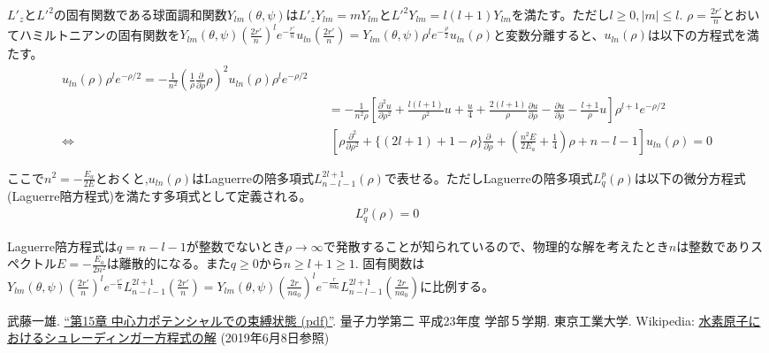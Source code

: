\documentclass[11pt,a4paper]{jsarticle}
\begin{document}
$L'_z$と$L'^2$の固有関数である球面調和関数$Y_{lm}(\theta,\psi)$は$L'_zY_{lm}=mY_{lm}$と$L'^2Y_{lm}=l(l+1)Y_{lm}$を満たす。ただし$l \ge 0, |m|\le l$. $\rho=\frac{2r'}{n}$とおいてハミルトニアンの固有関数を$Y_{lm}(\theta,\psi)(\frac{2r'}{n})^l e^{-\frac{r'}{n}} u_{ln}(\frac{2r'}{n})=Y_{lm}(\theta,\psi) \rho^l e^{-\frac{\rho}{2}} u_{ln}(\rho)$と変数分離すると、$u_{ln}(\rho)$は以下の方程式を満たす。
\begin{eqnarray}
[ \frac{E}{2E_a} &&+ \frac{1}{n \rho} - \frac{l(l+1)}{n^2 \rho^2}]u_{ln}(\rho)\rho^l e^{-\rho/2} = -\frac{1}{n^2}(\frac{1}{\rho}\frac{\partial }{\partial \rho }\rho)^2  u_{ln}(\rho)\rho^l e^{-\rho/2}\\
&&= -\frac{1}{n^2 \rho} [\frac{\partial^2 u}{\partial \rho^2}+\frac{l(l+1)}{\rho^2}u +\frac{u}{4} +\frac{2(l+1)}{\rho}\frac{\partial u}{\partial \rho} -\frac{\partial u}{\partial \rho} -\frac{l+1}{ \rho} u] \rho^{l+1} e^{-\rho/2}\\
\Leftrightarrow && \: [ \rho \frac{\partial^2}{\partial \rho^2} + \{ (2l+1)+1-\rho \} \frac{\partial}{\partial \rho} + (\frac{n^2 E}{2E_a} + \frac{1}{4})\rho + n-l-1] u_{ln}(\rho) =0
\end{eqnarray}

ここで$n^2=-\frac{E_a}{2E}$とおくと,$u_{ln}(\rho)$はLaguerreの陪多項式$L^{2l+1}_{n-l-1}(\rho)$で表せる。ただしLaguerreの陪多項式$L^{p}_{q}(\rho)$は以下の微分方程式(Laguerre陪方程式)を満たす多項式として定義される。
\begin{eqnarray}
[ \rho \frac{\partial^2}{\partial \rho^2} + ( p+1-\rho ) \frac{\partial}{\partial \rho} + q] L^{p}_{q}(\rho)=0
\end{eqnarray}

Laguerre陪方程式は$q=n-l-1$が整数でないとき$\rho \rightarrow \infty$で発散することが知られているので、物理的な解を考えたとき$n$は整数でありスペクトル$E=-\frac{E_a}{2n^2}$は離散的になる。また$q\ge0$から$n\ge l+1\ge1$. 固有関数は$Y_{lm}(\theta,\psi)(\frac{2r'}{n})^l e^{-\frac{r'}{n}} L^{2l+1}_{n-l-1}(\frac{2r'}{n})=Y_{lm}(\theta,\psi)(\frac{2r}{na_0})^l e^{-\frac{r}{na_0}} L^{2l+1}_{n-l-1}(\frac{2r}{na_0})$に比例する。


\begin{thebibliography}{9}
 武藤一雄. \href{http://www.th.phys.titech.ac.jp/~muto/lectures/QMII11/QMII11_chap15.pdf}{“第15章 中心力ポテンシャルでの束縛状態 (pdf)”}. 量子力学第二 平成23年度 学部５学期. 東京工業大学. 
 Wikipedia: \href{https://ja.wikipedia.org/wiki/水素原子におけるシュレーディンガー方程式の解}{水素原子におけるシュレーディンガー方程式の解} (2019年6月8日参照)
\end{thebibliography}
\end{document}
